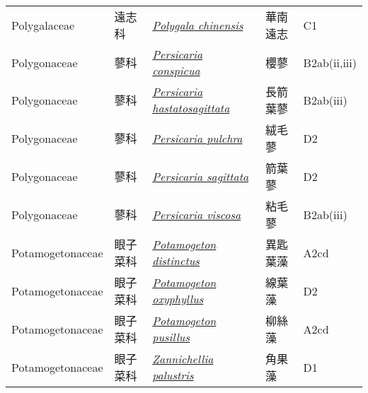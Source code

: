 {\begin{longtable}{p{2.5cm}p{2cm}p{5cm}p{2.5cm}p{3cm}}
    Polygalaceae & 遠志科 & \href{http://www.theplantlist.org/tpl1.1/search?q=Polygala+chinensis}{\textit{Polygala chinensis} } & 華南遠志 & C1 \index{Polygala@\textit{Polygala}!chinensis@\textit{chinensis}}  \index{華南遠志} \\
    Polygonaceae & 蓼科 & \href{http://www.theplantlist.org/tpl1.1/search?q=Persicaria+conspicua}{\textit{Persicaria conspicua} } & 櫻蓼 & B2ab(ii,iii) \index{Persicaria@\textit{Persicaria}!conspicua@\textit{conspicua}}  \index{櫻蓼} \\
    Polygonaceae & 蓼科 & \href{http://www.theplantlist.org/tpl1.1/search?q=Persicaria+hastatosagittata}{\textit{Persicaria hastatosagittata} } & 長箭葉蓼 & B2ab(iii) \index{Persicaria@\textit{Persicaria}!hastatosagittata@\textit{hastatosagittata}}  \index{長箭葉蓼} \\
    Polygonaceae & 蓼科 & \href{http://www.theplantlist.org/tpl1.1/search?q=Persicaria+pulchra}{\textit{Persicaria pulchra} } & 絨毛蓼 & D2 \index{Persicaria@\textit{Persicaria}!pulchra@\textit{pulchra}}  \index{絨毛蓼} \\
    Polygonaceae & 蓼科 & \href{http://www.theplantlist.org/tpl1.1/search?q=Persicaria+sagittata}{\textit{Persicaria sagittata} } & 箭葉蓼 & D2 \index{Persicaria@\textit{Persicaria}!sagittata@\textit{sagittata}}  \index{箭葉蓼} \\
    Polygonaceae & 蓼科 & \href{http://www.theplantlist.org/tpl1.1/search?q=Persicaria+viscosa}{\textit{Persicaria viscosa} } & 粘毛蓼 & B2ab(iii) \index{Persicaria@\textit{Persicaria}!viscosa@\textit{viscosa}}  \index{粘毛蓼} \\
    Potamogetonaceae & 眼子菜科 & \href{http://www.theplantlist.org/tpl1.1/search?q=Potamogeton+distinctus}{\textit{Potamogeton distinctus} } & 異匙葉藻 & A2cd \index{Potamogeton@\textit{Potamogeton}!distinctus@\textit{distinctus}}  \index{異匙葉藻} \\
    Potamogetonaceae & 眼子菜科 & \href{http://www.theplantlist.org/tpl1.1/search?q=Potamogeton+oxyphyllus}{\textit{Potamogeton oxyphyllus} } & 線葉藻 & D2 \index{Potamogeton@\textit{Potamogeton}!oxyphyllus@\textit{oxyphyllus}}  \index{線葉藻} \\
    Potamogetonaceae & 眼子菜科 & \href{http://www.theplantlist.org/tpl1.1/search?q=Potamogeton+pusillus}{\textit{Potamogeton pusillus} } & 柳絲藻 & A2cd \index{Potamogeton@\textit{Potamogeton}!pusillus@\textit{pusillus}}  \index{柳絲藻} \\
    Potamogetonaceae & 眼子菜科 & \href{http://www.theplantlist.org/tpl1.1/search?q=Zannichellia+palustris}{\textit{Zannichellia palustris} } & 角果藻 & D1 \index{Zannichellia@\textit{Zannichellia}!palustris@\textit{palustris}}  \index{角果藻} \\

\end{longtable}}
